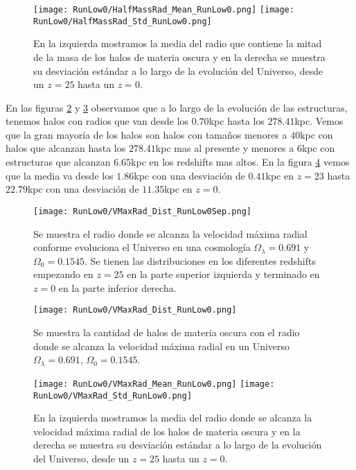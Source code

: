 \begin{figure}[H]
    \centering
    \texttt{[image: RunLow0/HalfMassRad\_Mean\_RunLow0.png]}
    \texttt{[image: RunLow0/HalfMassRad\_Std\_RunLow0.png]}
    \caption[Media y desviación estándar del radio de la mitad de la masa]{\footnotesize En la izquierda mostramos la media del radio que contiene la mitad de la masa de los halos de materia oscura y en la derecha se muestra su desviación estándar a lo largo de la evolución del Universo, desde un $z=25$ hasta un $z=0$.}
    \label{fig:Low0-HalfMassRadStats}
\end{figure}

En las figuras \ref{fig:Low0-VMaxRadDistSep} y \ref{fig:Low0-VMaxRadDist} observamos que a lo largo de la evolución de las estructuras, tenemos halos con radios que van desde los $0.70$kpc hasta los $278.41$kpc. Vemos que la gran mayoría de los halos son halos con tamaños menores a $40$kpc con halos que alcanzan hasta los $278.41$kpc mas al presente y menores a $6$kpc con estructuras que alcanzan $6.65$kpc en los redshifts mas altos. En la figura \ref{fig:Low0-VMaxRadStats} vemos que la media va desde los $1.86$kpc con una desviación de $0.41$kpc en $z=23$ hasta $22.79$kpc con una desviación de $11.35$kpc en $z=0$.

\begin{figure}[H]
    \centering
    \texttt{[image: RunLow0/VMaxRad\_Dist\_RunLow0Sep.png]}
    \caption[Radio donde se alcanza la velocidad máxima radial]{\footnotesize Se muestra el radio donde se alcanza la velocidad máxima radial conforme evoluciona el Universo en una cosmología $\Omega_\lambda = 0.691$ y $\Omega_0 = 0.1545$. Se tienen las distribuciones en los diferentes redshifts empezando en $z=25$ en la parte superior izquierda y terminado en $z=0$ en la parte inferior derecha.}
    \label{fig:Low0-VMaxRadDistSep}
\end{figure}

\begin{figure}[H]
    \centering
    \texttt{[image: RunLow0/VMaxRad\_Dist\_RunLow0.png]}
    \caption[Distribución del radio donde se alcanza la velocidad máxima radial]{\footnotesize Se muestra la cantidad de halos de materia oscura con el radio donde se alcanza la velocidad máxima radial en un Universo $\Omega_\lambda = 0.691$, $\Omega_0 = 0.1545$.}
    \label{fig:Low0-VMaxRadDist}
\end{figure}

\begin{figure}[H]
    \centering
    \texttt{[image: RunLow0/VMaxRad\_Mean\_RunLow0.png]}
    \texttt{[image: RunLow0/VMaxRad\_Std\_RunLow0.png]}
    \caption[Media y desviación estándar del Radio donde se alcanza la velocidad máxima radial]{\footnotesize En la izquierda mostramos la media del radio donde se alcanza la velocidad máxima radial de los halos de materia oscura y en la derecha se muestra su desviación estándar a lo largo de la evolución del Universo, desde un $z=25$ hasta un $z=0$.}
    \label{fig:Low0-VMaxRadStats}
\end{figure}

